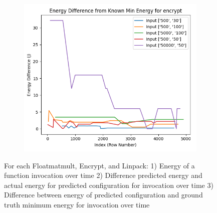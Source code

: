 \documentclass[times, 10pt,twocolumn]{article}
\begin{document}
\begin{figure}[ht]
\begin{subfigure}[b]{0.3\textwidth}
     \caption{}
     \label{fig:encrypt_energy_diff}
   \end{subfigure}
   \hfill
   \begin{subfigure}[b]{0.3\textwidth}
      \includegraphics[width=\textwidth]{imgs/final_experiment_plots/model_analysis/measurement_data_analysis/encrypt_compare_min.png}
     \caption{}
     \label{fig:encrypt_compare_min}
   \end{subfigure}

   \caption{For each Floatmatmult, Encrypt, and Linpack: 1) Energy of a function invocation over time 2) Difference predicted energy and actual energy for predicted configuration for invocation over time 3) Difference between energy of predicted configuration and ground truth minimum energy for invocation over time}
   \label{fig:model_performance_measurement_study_}
\end{figure}
\end{document}
